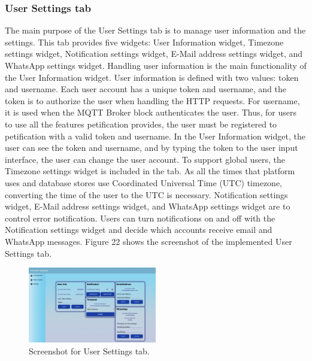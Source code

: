\documentclass[conference]{IEEEtran}
\begin{document}
\subsubsection{User Settings tab}
The main purpose of the User Settings tab is to manage user information and the settings. This tab provides five widgets: User Information widget, Timezone settings widget, Notification settings widget, E-Mail address settings widget, and WhatsApp settings widget. Handling user information is the main functionality of the User Information widget. User information is defined with two values: token and username. Each user account has a unique token and username, and the token is to authorize the user when handling the HTTP requests. For username, it is used when the MQTT Broker block authenticates the user. Thus, for users to use all the features petification provides, the user must be registered to petification with a valid token and username. In the User Information widget, the user can see the token and username, and by typing the token to the user input interface, the user can change the user account.
\indent To support global users, the Timezone settings widget is included in the tab. As all the times that platform uses and database stores use Coordinated Universal Time (UTC) timezone, converting the time of the user to the UTC is necessary. Notification settings widget, E-Mail address settings widget, and WhatsApp settings widget are to control error notification. Users can turn notifications on and off with the Notification settings widget and decide which accounts receive email and WhatsApp messages. Figure 22
shows the screenshot of the implemented User Settings tab.

\begin{figure}[htbp]
\centerline{\includegraphics[width=0.5\textwidth]{./images/user_settings_ui.png}}
\caption{Screenshot for User Settings tab.}
\label{fig}
\end{figure}
\end{document}
